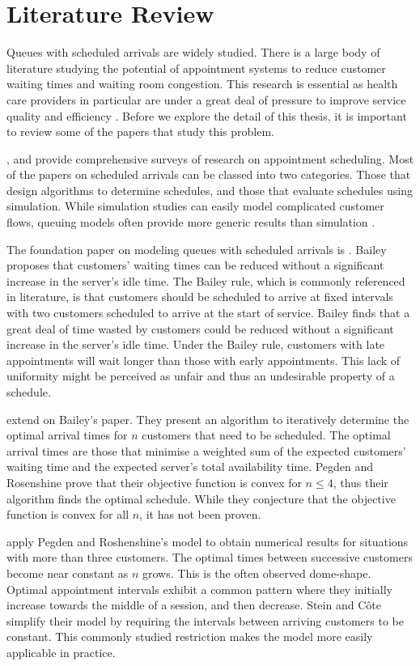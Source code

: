 \chapter{Literature Review}
Queues with scheduled arrivals are widely studied. There is a large body of literature studying the potential of appointment systems to reduce customer waiting times and waiting room congestion. This research is essential as health care providers in particular are under a great deal of pressure to improve service quality and efficiency \citep{Goldsmith}.  Before we explore the detail of this thesis, it is important to review some of the papers that study this problem.

\citet{Fomundam}, and \citet{Cayirli} provide comprehensive surveys of research on appointment scheduling. Most of the papers on scheduled arrivals can be classed into two categories. Those that design algorithms to determine schedules, and those that evaluate schedules using simulation. While simulation studies can easily model complicated customer flows, queuing models often provide more generic results than simulation \citep{Green}.

The foundation paper on modeling queues with scheduled arrivals is \citet{Bailey}. Bailey proposes that customers' waiting times can be reduced without a significant increase in the server's idle time. The Bailey rule, which is commonly referenced in literature, is that customers should be scheduled to arrive at fixed intervals with two customers scheduled to arrive at the start of service. Bailey finds that a great deal of time wasted by customers could be reduced without a significant increase in the server's idle time. Under the Bailey rule, customers with late appointments will wait longer than those with early appointments. This lack of uniformity might be perceived as unfair and thus an undesirable property of a schedule. 

\citet{Pegden} extend on Bailey's paper. They present an algorithm to iteratively determine the optimal arrival times for $n$ customers that need to be scheduled. The optimal arrival times are those that minimise a weighted sum of the expected customers' waiting time and the expected server's total availability time. Pegden and Rosenshine prove that their objective function is convex for $n \leq 4$, thus their algorithm finds the optimal schedule. While they conjecture that the objective function is convex for all $n$, it has not been proven.

\citet{Stein} apply Pegden and Roshenshine's model to obtain numerical results for situations with more than three customers. The optimal times between successive customers become near constant as $n$ grows. This is the often observed dome-shape. Optimal appointment intervals exhibit a common pattern where they initially increase towards the middle of a session, and then decrease. Stein and C\^{o}te simplify their model by requiring the intervals between arriving customers to be constant. This commonly studied restriction makes the model more easily applicable in practice.

